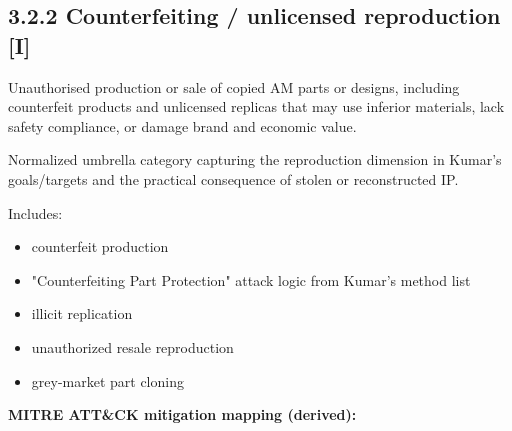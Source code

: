 \documentclass[10pt,a4paper,oneside]{report}
\begin{document}
\subsection{3.2.2 Counterfeiting / unlicensed reproduction [I]}


Unauthorised production or sale of copied AM parts or designs, including counterfeit products and unlicensed replicas that may use inferior materials, lack safety compliance, or damage brand and economic value.

Normalized umbrella category capturing the reproduction dimension in Kumar's goals/targets and the practical consequence of stolen or reconstructed IP.

Includes:

\begin{itemize}
\item counterfeit production
\item "Counterfeiting Part Protection" attack logic from Kumar's method list
\item illicit replication
\item unauthorized resale reproduction
\item grey-market part cloning
\end{itemize}

\textbf{MITRE ATT\&CK mitigation mapping (derived):}
\end{document}

